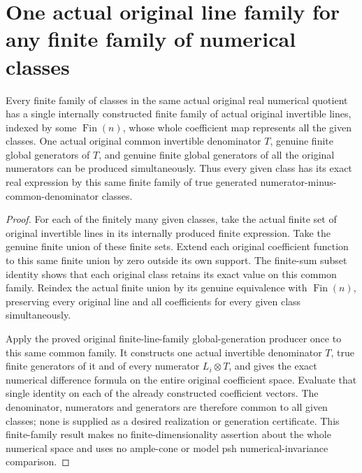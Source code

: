 \section{One actual original line family for any finite family of numerical classes}
\label{sec:native-numerical-finite-class-families}

\begin{theorem}
\label{thm:native-numerical-finite-class-families}
\leanok
{}
Every finite family of classes in the same actual original real
numerical quotient has a single internally constructed finite
family of actual original invertible lines, indexed by some
$\operatorname{Fin}(n)$, whose whole coefficient map represents
all the given classes. One actual original common invertible
denominator $T$, genuine finite global generators of $T$, and
genuine finite global generators of all the original numerators
can be produced simultaneously. Thus every given class has its
exact real expression by this same finite family of true generated
numerator-minus-common-denominator classes.
\end{theorem}

\begin{proof}
For each of the finitely many given classes, take the actual finite
set of original invertible lines in its internally produced finite
expression. Take the genuine finite union of these finite sets.
Extend each original coefficient function to this same finite union
by zero outside its own support. The finite-sum subset identity
shows that each original class retains its exact value on this
common family. Reindex the actual finite union by its genuine
equivalence with $\operatorname{Fin}(n)$, preserving every original
line and all coefficients for every given class simultaneously.

Apply the proved original finite-line-family global-generation
producer once to this same common family. It constructs one
actual invertible denominator $T$, true finite generators of it
and of every numerator $L_i\otimes T$, and gives the exact
numerical difference formula on the entire original coefficient
space. Evaluate that single identity on each of the already
constructed coefficient vectors. The denominator, numerators and
generators are therefore common to all given classes; none is
supplied as a desired realization or generation certificate. This
finite-family result makes no finite-dimensionality assertion
about the whole numerical space and uses no ample-cone or model
psh numerical-invariance comparison.
\end{proof}
